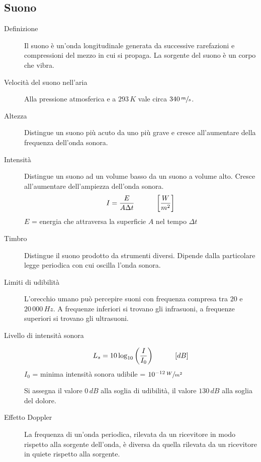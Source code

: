 \documentclass[a4paper,11pt,italian]{article}
\begin{document}
\subsection{Suono}

\begin{description}
  \item[Definizione] 
  Il suono è un'onda longitudinale generata da successive rarefazioni e compressioni del mezzo in cui si propaga.
  La sorgente del suono è un corpo che vibra.

  \item[Velocità del suono nell'aria] 
  Alla pressione atmosferica e a $ 293 \, K $ vale circa $ 340 \, \sfrac{m}{s} $.

  \item[Altezza] 
  Distingue un suono più acuto da uno più grave e cresce all'aumentare della frequenza dell'onda sonora.

  \item[Intensità]
  Distingue un suono ad un volume basso da un suono a volume alto. Cresce all'aumentare dell'ampiezza dell'onda sonora.
  \[ I = \frac{E}{A \Delta t} \hspace*{3em} \left[ \frac{W}{m^2} \right]\]
  $ E $ = energia che attraversa la superficie $ A $ nel tempo $ \Delta t $

  \item[Timbro] 
  Distingue il suono prodotto da strumenti diversi. Dipende dalla particolare legge periodica con cui oscilla l'onda sonora.

  \item[Limiti di udibilità] 
  L'orecchio umano può percepire suoni con frequenza compresa tra $ 20 $ e $ 20\, 000 \, Hz $. A frequenze inferiori si trovano gli infrasuoni, a frequenze superiori si trovano gli ultrasuoni.

  \item[Livello di intensità sonora]
  \[ L_s = 10 \log_{10} \left(\frac{I}{I_0}\right) \hspace*{3em} [dB] \]
  $ I_0 $ = minima intensità sonora udibile = $ 10^{-12} \, \sfrac{W}{m^2} $
  
  Si assegna il valore $ 0 \, dB $ alla soglia di udibilità, il valore $ 130 \, dB $ alla soglia del dolore.

  \item[Effetto Doppler] 
  La frequenza di un'onda periodica, rilevata da un ricevitore in modo rispetto alla sorgente dell'onda, è diversa da quella rilevata da un ricevitore in quiete rispetto alla sorgente.
  

\end{description}
\end{document}
